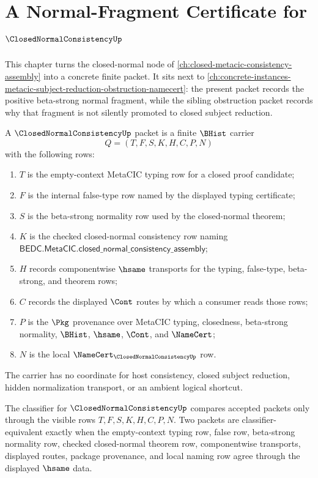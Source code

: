 \chapter{A Normal-Fragment Certificate for $\ClosedNormalConsistencyUp$}
\label{ch:concrete-instances-closednormalconsistency-namecert}

This chapter turns the closed-normal node of \autoref{ch:closed-metacic-consistency-assembly} into a concrete finite packet. It sits next to \autoref{ch:concrete-instances-metacic-subject-reduction-obstruction-namecert}: the present packet records the positive beta-strong normal fragment, while the sibling obstruction packet records why that fragment is not silently promoted to closed subject reduction.

\begin{definition}
\label{def:closed-normal-consistency-packet}
A $\ClosedNormalConsistencyUp$ packet is a finite $\BHist$ carrier
$$
Q=(T,F,S,K,H,C,P,N)
$$
with the following rows:
\begin{enumerate}
\item $T$ is the empty-context MetaCIC typing row for a closed proof candidate;
\item $F$ is the internal false-type row named by the displayed typing certificate;
\item $S$ is the beta-strong normality row used by the closed-normal theorem;
\item $K$ is the checked closed-normal consistency row naming $\mathsf{BEDC.MetaCIC.closed\_normal\_consistency\_assembly}$;
\item $H$ records componentwise $\hsame$ transports for the typing, false-type, beta-strong, and theorem rows;
\item $C$ records the displayed $\Cont$ routes by which a consumer reads those rows;
\item $P$ is the $\Pkg$ provenance over MetaCIC typing, closedness, beta-strong normality, $\BHist$, $\hsame$, $\Cont$, and $\NameCert$;
\item $N$ is the local $\NameCert_{\ClosedNormalConsistencyUp}$ row.
\end{enumerate}
The carrier has no coordinate for host consistency, closed subject reduction, hidden normalization transport, or an ambient logical shortcut.
\end{definition}

\begin{definition}
\label{def:closed-normal-consistency-classifier}
The classifier for $\ClosedNormalConsistencyUp$ compares accepted packets only through the visible rows $T,F,S,K,H,C,P,N$. Two packets are classifier-equivalent exactly when the empty-context typing row, false row, beta-strong normality row, checked closed-normal theorem row, componentwise transports, displayed routes, package provenance, and local naming row agree through the displayed $\hsame$ data.
\end{definition}

